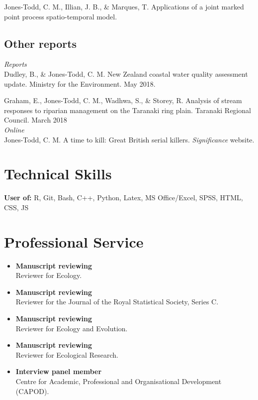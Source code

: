 \documentclass[10pt,a4paper]{moderncv}
\begin{document}
\vspace{-3pt}

Jones-Todd, C. M., Illian, J. B., \& Marques, T. Applications of a joint marked point process spatio-temporal model.\\



\subsection{Other reports}

\vspace{5pt}

\textit{\small{Reports}}\\

Dudley, B., \& Jones-Todd, C. M. New Zealand coastal water quality assessment update. Ministry for the Environment. May 2018.

Graham, E., Jones-Todd, C. M., Wadhwa, S., \& Storey, R. Analysis of stream responses to riparian management on the Taranaki ring plain. Taranaki Regional Council. March 2018\\

\textit{\small{Online}}\\

Jones-Todd, C. M. A time to kill: Great British serial killers. \textit{Significance} website.

\vspace{5pt}


\newpage

\section{Technical Skills}

\vspace{6pt}
    \textbf{User of:} R, Git, Bash, C++, Python, Latex, MS Office/Excel, SPSS, HTML, CSS, JS


\section{Professional Service}

\vspace{6pt}

\begin{itemize}
  \item \textbf{Manuscript reviewing}\\
Reviewer for Ecology.
 \item \textbf{Manuscript reviewing}\\
Reviewer for the Journal of the Royal Statistical Society, Series C.
 \item \textbf{Manuscript reviewing}\\
   Reviewer for Ecology and Evolution.
   \item \textbf{Manuscript reviewing}\\
Reviewer for Ecological Research.
\item \textbf{Interview panel member}\\
 Centre for Academic, Professional and Organisational Development (CAPOD).
\end{itemize}
\end{document}
